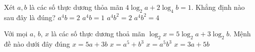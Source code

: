 \begin{ex}	
	Xét $a,b$ là các số thực dương thỏa mãn $4\log_2a+2\log_4b=1$. Khẳng định nào sau đây là đúng?
	\choice
	{\True $a^4b=2$}
	{ $a^4b=1$}
	{ $a^4{b^2}=2$}
	{ $a^4{b^2}=4$}
\end{ex}

\begin{ex}
	Với mọi $a$, $b$, $x$ là các số thực dương thoả mãn $\log_{2}x=5\log_{2}a+3\log_{2}b$. Mệnh đề nào dưới đây đúng
	\choice
	{$x=5a+3b$}
	{$x=a^5+b^3$}
	{\True $x=a^5b^3$}
	{$x=3a+5b$}
\end{ex}

